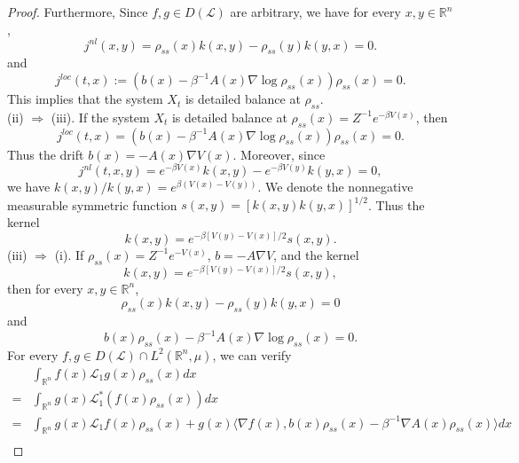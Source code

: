 \documentclass[10pt,a4paper]{amsart}
\begin{document}
\begin{proof}
Furthermore, Since $f,g \in D(\mathcal{L})$ are arbitrary, we have for every $x,y \in \mathbb{R}^n$,
\begin{equation}
    j^{nl}(x,y)= \rho_{ss}(x)k(x,y) - \rho_{ss}(y)k(y,x) = 0.
\end{equation}
and
\begin{equation*}
    j^{loc}(t,x) := (b(x) - \beta^{-1} A(x)\nabla \log \rho_{ss}(x))\rho_{ss}(x) = 0.
\end{equation*}
This implies that the system $X_t$ is detailed balance at $\rho_{ss}$.\\
(ii) $\Rightarrow$ (iii). If the system $X_t$ is detailed balance at $\rho_{ss}(x) = Z^{-1} e^{-\beta V(x)}$, then 
\begin{equation*}
    j^{loc}(t,x) = (b(x) - \beta^{-1}A(x) \nabla \log\rho_{ss}(x))\rho_{ss}(x) = 0.
\end{equation*}
Thus the drift $b(x) = -A(x)\nabla V(x)$. 
Moreover, since 
\begin{equation*}
    j^{nl}(t,x,y) =e^{-\beta V(x)}k(x,y) - e^{-\beta V(y)}k(y,x) =0,
\end{equation*}
we have $k(x,y)/k(y,x) = e^{\beta(V(x) - V(y))}$.
We denote the nonnegative measurable symmetric function $s(x,y) = [k(x,y)k(y,x)]^{1/2}$.
Thus the kernel
\begin{equation*}
    k(x,y) = e^{-\beta[V(y)-V(x)]/2} s(x,y).
\end{equation*}
(iii) $\Rightarrow$ (i). If $\rho_{ss}(x) = Z^{-1} e^{-V(x)}$, $b = -A\nabla V$, and the kernel
\begin{equation*}
    k(x,y) = e^{-\beta[V(y)-V(x)]/2} s(x,y),
\end{equation*}
then for every $x,y \in \mathbb{R}^n$,
\begin{equation}
    \rho_{ss}(x)k(x,y) - \rho_{ss}(y)k(y,x) = 0
\end{equation}
and
\begin{equation*}
    b(x)\rho_{ss}(x) - \beta^{-1} A(x)\nabla \log \rho_{ss}(x) = 0.
\end{equation*}
For every $f,g \in D(\mathcal{L}) \cap L^2(\mathbb{R}^n, \mu)$, we can verify
\begin{align*}
    & \int_{\mathbb{R}^n} f(x) \mathcal{L}_{1}g(x) \rho_{ss}(x)dx \\
    = & \int_{\mathbb{R}^n} g(x) \mathcal{L}_{1}^{\ast}(f(x) \rho_{ss}(x))dx \\
    = & \int_{\mathbb{R}^n} g(x) \mathcal{L}_{1}f(x) \rho_{ss}(x) + g(x)\langle \nabla f(x), b(x)\rho_{ss}(x) - \beta^{-1} \nabla A(x) \rho_{ss}(x) \rangle dx \\

\end{align*}
\end{proof}
\end{document}
